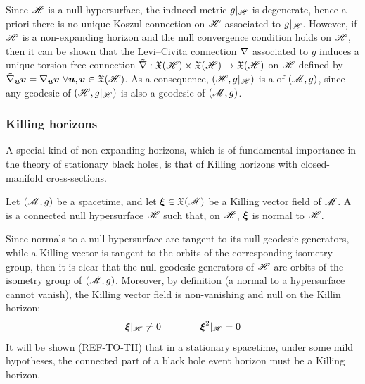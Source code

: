 Since $ \mathscr{H} $ is a null hypersurface, the induced metric $ g \vert_\mathscr{H} $ is degenerate, hence a priori there is no unique Koszul connection on $ \mathscr{H} $ associated to $ g \vert_\mathscr{H} $. However, if $ \mathscr{H} $ is a non-expanding horizon and the null convergence condition holds on $ \mathscr{H} $, then it can be shown that the Levi--Civita connection $ \nabla $ associated to $ g $ induces a unique torsion-free connection $ \tilde{\nabla} : \mathfrak{X}(\mathscr{H}) \times \mathfrak{X}(\mathscr{H}) \rightarrow \mathfrak{X}(\mathscr{H}) $ on $ \mathscr{H} $ defined by $ \tilde{\nabla}_{\boldsymbol{u}} \boldsymbol{v} = \nabla_{\boldsymbol{u}} \boldsymbol{v} \,\,\forall \boldsymbol{u} , \boldsymbol{v} \in \mathfrak{X}(\mathscr{H}) $. As a consequence, $ (\mathscr{H} , g \vert_\mathscr{H}) $ is a  of $ (\mathscr{M} , g) $, since any geodesic of $ (\mathscr{H} , g \vert_\mathscr{H}) $ is also a geodesic of $ (\mathscr{M} , g) $.

\subsubsection{Killing horizons}

A special kind of non-expanding horizons, which is of fundamental importance in the theory of stationary black holes, is that of Killing horizons with closed-manifold cross-sections.

\begin{definition}{}{}
  Let $ (\mathscr{M} , g) $ be a spacetime, and let $ \boldsymbol{\xi} \in \mathfrak{X}(\mathscr{M}) $ be a Killing vector field of $ \mathscr{M} $. A  is a connected null hypersurface $ \mathscr{H} $ such that, on $ \mathscr{H} $, $ \boldsymbol{\xi} $ is normal to $ \mathscr{H} $.
\end{definition}

Since normals to a null hypersurface are tangent to its null geodesic generators, while a Killing vector is tangent to the orbits of the corresponding isometry group\footnotemark, then it is clear that the null geodesic generators of $ \mathscr{H} $ are orbits of the isometry group of $ (\mathscr{M} , g) $. Moreover, by definition (a normal to a hypersurface cannot vanish), the Killing vector field is non-vanishing and null on the Killin horizon:
\begin{equation*}
  \boldsymbol{\xi} \vert_\mathscr{H} \neq 0
  \qquad \qquad
  \boldsymbol{\xi}^2 \vert_\mathscr{H} = 0
\end{equation*}
It will be shown (REF-TO-TH) that in a stationary spacetime, under some mild hypotheses, the connected part of a black hole event horizon must be a Killing horizon.


